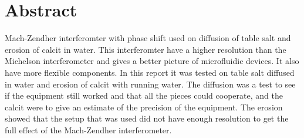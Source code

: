 \section {Abstract}
  Mach-Zendher interferomter with phase shift used on diffusion of table salt and 
  erosion of calcit in water. This interferomter have a higher resolution than the 
  Michelson interferometer and gives a better picture of microfluidic devices. It 
  also have more flexible components. In this report it was tested
  on table salt diffused in water and erosion of calcit with running water.
  The diffusion was a test to see if the equipment still worked and that all the
  pieces could cooperate, and the calcit were to give an estimate of the precision
  of the equipment. The erosion showed that the setup that was used did not have 
  enough resolution to get the full effect of the Mach-Zendher interferometer.
